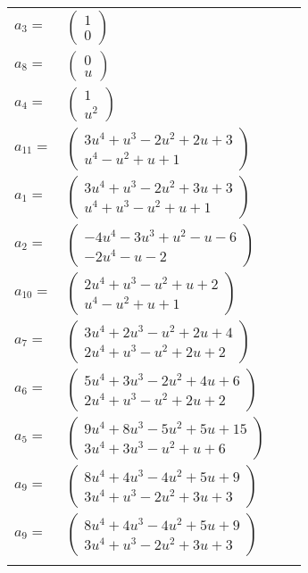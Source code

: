 \documentclass[1p]{elsarticle_modified}
\theoremstyle{definition}
\begin{document}
\begin{tabular}{m{7pt} m{180pt} m{7pt} m{180pt} }
\flushright $a_{3}=$&$\begin{pmatrix}1\\0\end{pmatrix}$ \\
\flushright $a_{8}=$&$\begin{pmatrix}0\\u\end{pmatrix}$ \\
\flushright $a_{4}=$&$\begin{pmatrix}1\\u^2\end{pmatrix}$ \\
\flushright $a_{11}=$&$\begin{pmatrix}3 u^4+u^3-2 u^2+2 u+3\\u^4- u^2+u+1\end{pmatrix}$ \\
\flushright $a_{1}=$&$\begin{pmatrix}3 u^4+u^3-2 u^2+3 u+3\\u^4+u^3- u^2+u+1\end{pmatrix}$ \\
\flushright $a_{2}=$&$\begin{pmatrix}-4 u^4-3 u^3+u^2- u-6\\-2 u^4- u-2\end{pmatrix}$ \\
\flushright $a_{10}=$&$\begin{pmatrix}2 u^4+u^3- u^2+u+2\\u^4- u^2+u+1\end{pmatrix}$ \\
\flushright $a_{7}=$&$\begin{pmatrix}3 u^4+2 u^3- u^2+2 u+4\\2 u^4+u^3- u^2+2 u+2\end{pmatrix}$ \\
\flushright $a_{6}=$&$\begin{pmatrix}5 u^4+3 u^3-2 u^2+4 u+6\\2 u^4+u^3- u^2+2 u+2\end{pmatrix}$ \\
\flushright $a_{5}=$&$\begin{pmatrix}9 u^4+8 u^3-5 u^2+5 u+15\\3 u^4+3 u^3- u^2+u+6\end{pmatrix}$ \\
\flushright $a_{9}=$&$\begin{pmatrix}8 u^4+4 u^3-4 u^2+5 u+9\\3 u^4+u^3-2 u^2+3 u+3\end{pmatrix}$\\ \flushright $a_{9}=$&$\begin{pmatrix}8 u^4+4 u^3-4 u^2+5 u+9\\3 u^4+u^3-2 u^2+3 u+3\end{pmatrix}$\\&\end{tabular}
\end{document}
